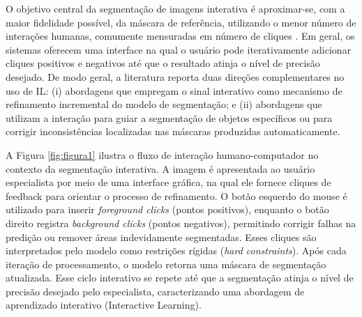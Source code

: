 O objetivo central da segmentação de imagens interativa é aproximar-se, com a maior fidelidade possível, da máscara de referência, utilizando o menor número de interações humanas, comumente mensuradas em número de cliques \cite{sofiiuk2020fbrs_arxiv}. Em geral, os sistemas oferecem uma interface na qual o usuário pode iterativamente adicionar cliques positivos e negativos até que o resultado atinja o nível de precisão desejado.
De modo geral, a literatura reporta duas direções complementares no uso de IL: (i) abordagens que empregam o sinal interativo como mecanismo de refinamento incremental do modelo de segmentação; e (ii) abordagens que utilizam a interação para guiar a segmentação de objetos específicos ou para corrigir inconsistências localizadas nas máscaras produzidas automaticamente.

A Figura \ref{fig:figura1} ilustra o fluxo de interação humano-computador no contexto da segmentação interativa. A imagem é apresentada ao usuário especialista por meio de uma interface gráfica, na qual ele fornece cliques de feedback para orientar o processo de refinamento. O botão esquerdo do mouse é utilizado para inserir \textit{foreground clicks} (pontos positivos), enquanto o botão direito registra \textit{background clicks} (pontos negativos), permitindo corrigir falhas na predição ou remover áreas indevidamente segmentadas. Esses cliques são interpretados pelo modelo como restrições rígidas (\textit{hard constraints}). Após cada iteração de processamento, o modelo retorna uma máscara de segmentação atualizada. Esse ciclo interativo se repete até que a segmentação atinja o nível de precisão desejado pelo especialista, caracterizando uma abordagem de aprendizado interativo (Interactive Learning).


